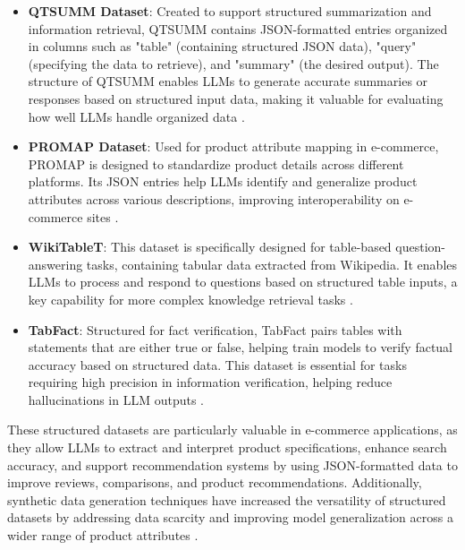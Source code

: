 \begin{itemize}
    \item \textbf{QTSUMM Dataset}: Created to support structured summarization and information retrieval, QTSUMM contains JSON-formatted entries organized in columns such as "table" (containing structured JSON data), "query" (specifying the data to retrieve), and "summary" (the desired output). The structure of QTSUMM enables LLMs to generate accurate summaries or responses based on structured input data, making it valuable for evaluating how well LLMs handle organized data \cite{zhao2023qtsummqueryfocusedsummarizationtabular}.
    
    \item \textbf{PROMAP Dataset}: Used for product attribute mapping in e-commerce, PROMAP is designed to standardize product details across different platforms. Its JSON entries help LLMs identify and generalize product attributes across various descriptions, improving interoperability on e-commerce sites \cite{macková2023promapdatasetsproductmapping}.
    
    \item \textbf{WikiTableT}: This dataset is specifically designed for table-based question-answering tasks, containing tabular data extracted from Wikipedia. It enables LLMs to process and respond to questions based on structured table inputs, a key capability for more complex knowledge retrieval tasks \cite{chen2021wikitabletlargescaledatatotextdataset}.
    
    \item \textbf{TabFact}: Structured for fact verification, TabFact pairs tables with statements that are either true or false, helping train models to verify factual accuracy based on structured data. This dataset is essential for tasks requiring high precision in information verification, helping reduce hallucinations in LLM outputs \cite{chen2020tabfactlargescaledatasettablebased}.
\end{itemize}

These structured datasets are particularly valuable in e-commerce applications, as they allow LLMs to extract and interpret product specifications, enhance search accuracy, and support recommendation systems by using JSON-formatted data to improve reviews, comparisons, and product recommendations. Additionally, synthetic data generation techniques have increased the versatility of structured datasets by addressing data scarcity and improving model generalization across a wider range of product attributes \cite{suri2023largelanguagemodelsdecision}.



